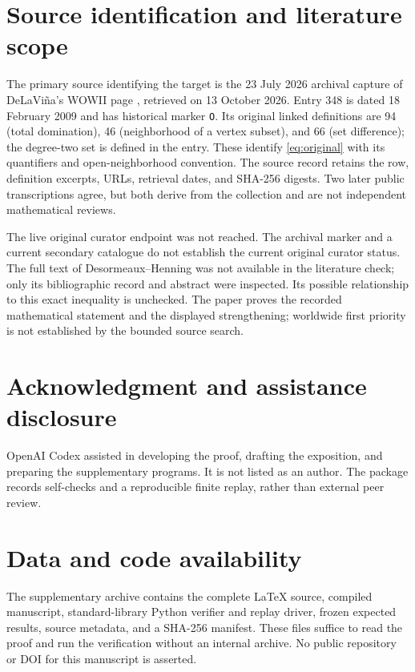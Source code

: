 \documentclass[11pt,a4paper]{article}
\theoremstyle{remark}
\begin{document}
\section{Source identification and literature scope}
\label{app:sources}

The primary source identifying the target is the 23 July 2026
archival capture of DeLaVi\~na's WOWII page \cite{wowii}, retrieved
on 13 October 2026. Entry 348 is dated 18 February 2009 and has
historical marker \texttt{O}. Its original linked definitions are
94 (total domination), 46 (neighborhood of a vertex subset), and
66 (set difference); the degree-two set is defined in the entry.
These identify \eqref{eq:original} with its quantifiers and
open-neighborhood convention. The source record retains the row,
definition excerpts, URLs, retrieval dates, and SHA-256 digests.
Two later public transcriptions agree, but both derive from the
collection and are not independent mathematical reviews.

The live original curator endpoint was not reached. The archival
marker and a current secondary catalogue do not establish the
current original curator status. The full text of
Desormeaux--Henning \cite{dh} was not available in the literature
check; only its bibliographic record and abstract were inspected.
Its possible relationship to this exact inequality is unchecked.
The paper proves the recorded mathematical statement and the
displayed strengthening; worldwide first priority is not established
by the bounded source search.

\section*{Acknowledgment and assistance disclosure}
OpenAI Codex assisted in developing the proof, drafting the exposition,
and preparing the supplementary programs. It is not listed as an author.
The package records self-checks and a reproducible finite replay,
rather than external peer review.

\section*{Data and code availability}
The supplementary archive contains the complete LaTeX source,
compiled manuscript, standard-library Python verifier and replay driver,
frozen expected results, source metadata, and a SHA-256 manifest.
These files suffice to read the proof and run the verification
without an internal archive. No public repository or DOI for this
manuscript is asserted.
\end{document}
